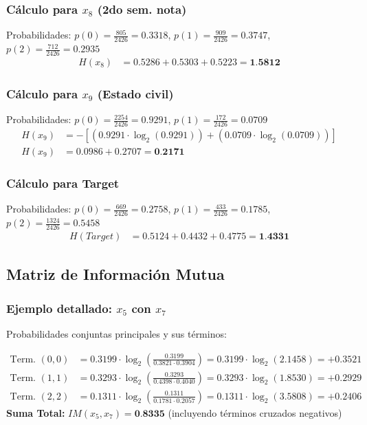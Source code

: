 \documentclass[12pt,a4paper]{article}
\begin{document}
\subsubsection{Cálculo para $x_8$ (2do sem. nota)}
Probabilidades: $p(0) = \frac{805}{2426} = 0.3318$, $p(1) = \frac{909}{2426} = 0.3747$, $p(2) = \frac{712}{2426} = 0.2935$
\begin{align*}
    H(x_8) &= 0.5286 + 0.5303 + 0.5223 = \textbf{1.5812}
\end{align*}

\subsubsection{Cálculo para $x_9$ (Estado civil)}
Probabilidades: $p(0) = \frac{2254}{2426} = 0.9291$, $p(1) = \frac{172}{2426} = 0.0709$
\begin{align*}
    H(x_9) &= -\left[ (0.9291 \cdot \log_2(0.9291)) + (0.0709 \cdot \log_2(0.0709)) \right] \\
    H(x_9) &= 0.0986 + 0.2707 = \textbf{0.2171}
\end{align*}

\subsubsection{Cálculo para Target}
Probabilidades: $p(0) = \frac{669}{2426} = 0.2758$, $p(1) = \frac{433}{2426} = 0.1785$, $p(2) = \frac{1324}{2426} = 0.5458$
\begin{align*}
    H(Target) &= 0.5124 + 0.4432 + 0.4775 = \textbf{1.4331}
\end{align*}

\subsection{Matriz de Información Mutua}

\subsubsection{Ejemplo detallado: $x_5$ con $x_7$}
Probabilidades conjuntas principales y sus términos:

\begin{align*}
    \text{Term. } (0,0) &= 0.3199 \cdot \log_2\left(\frac{0.3199}{0.3821 \cdot 0.3904}\right) = 0.3199 \cdot \log_2(2.1458) = \mathbf{+0.3521} \\
    \text{Term. } (1,1) &= 0.3293 \cdot \log_2\left(\frac{0.3293}{0.4398 \cdot 0.4040}\right) = 0.3293 \cdot \log_2(1.8530) = \mathbf{+0.2929} \\
    \text{Term. } (2,2) &= 0.1311 \cdot \log_2\left(\frac{0.1311}{0.1781 \cdot 0.2057}\right) = 0.1311 \cdot \log_2(3.5808) = \mathbf{+0.2406}
\end{align*}
\textbf{Suma Total:} $IM(x_5, x_7) = \textbf{0.8335}$ (incluyendo términos cruzados negativos)
\end{document}
